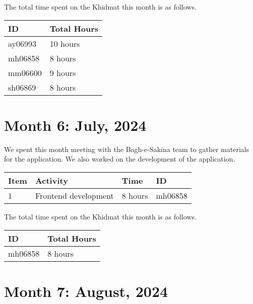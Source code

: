 \documentclass{article}
\begin{document}
\noindent The total time spent on the Khidmat this month is as follows.

\vspace{1em}

\noindent \begin{tabular}{|l|l|}
  \hline
  ID & Total Hours \\\hline
  ay06993 & 10 hours \\ \hline
  mh06858 & 8 hours  \\ \hline
  mm06600 & 9 hours \\ \hline
  sh06869 & 8 hours \\ \hline
\end{tabular}

\newpage %
\section*{Month 6: July, 2024}

We spent this month meeting with the Bagh-e-Sakina team to gather materials for the application. We also worked on the development of the application.

\vspace{1em}

\noindent \begin{tabular}{|l|l|l|l|}
  \hline
  Item & Activity & Time & ID \\ \hline
  1    & Frontend development & 8 hours  & mh06858 \\ \hline
\end{tabular}

\vspace{1em}

\noindent The total time spent on the Khidmat this month is as follows.

\vspace{1em}

\noindent \begin{tabular}{|l|l|}
  \hline
  ID      & Total Hours \\\hline
  mh06858 & 8 hours    \\\hline
\end{tabular}

\newpage
\section*{Month 7: August, 2024}
\end{document}
